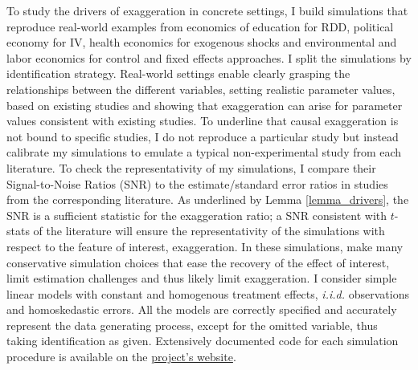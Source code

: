 \documentclass[usletter, 12pt]{article}
\begin{document}
    		To study the drivers of exaggeration in concrete settings, I build simulations that reproduce real-world examples from economics of education for RDD, %
		political economy for IV, health economics for exogenous shocks and environmental and labor economics for control and fixed effects approaches. I split the simulations by identification strategy. %
		 Real-world settings enable clearly grasping the relationships between the different variables, setting realistic parameter values, based on existing studies and showing that exaggeration can arise for parameter values consistent with existing studies. To underline that causal exaggeration is not bound to specific studies, I do not reproduce a particular study but instead calibrate my simulations to emulate a typical non-experimental study from each literature. To check the representativity of my simulations, I compare their Signal-to-Noise Ratios (SNR) to the estimate/standard error ratios in studies from the corresponding literature. As underlined by Lemma \ref{lemma_drivers}, the SNR is a sufficient statistic for the exaggeration ratio; a SNR consistent with $t$-stats of the literature will ensure the representativity of the simulations with respect to the feature of interest, exaggeration. 
		 In these simulations, make many conservative simulation choices that ease the recovery of the effect of interest, limit estimation challenges and thus likely limit exaggeration. I consider simple linear models with constant and homogenous treatment effects, \textit{i.i.d.} observations and homoskedastic errors. All the models are correctly specified and accurately represent the data generating process, except for the omitted variable, thus taking identification as given. 
		Extensively documented code for each simulation procedure is available on the \href{https://vincentbagilet.github.io/causal_exaggeration/}{project's website}.
		
\end{document}
